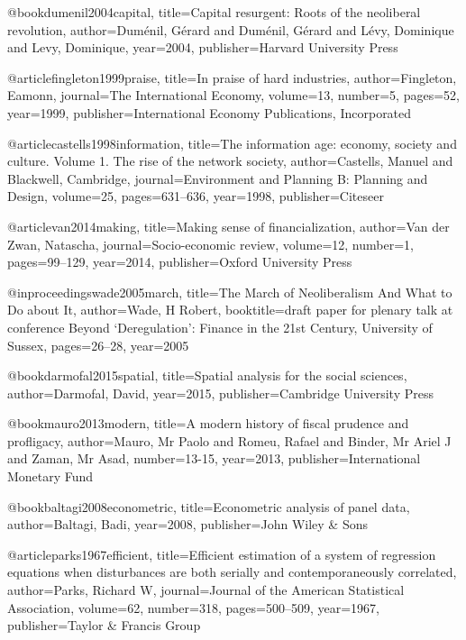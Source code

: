 @book{dumenil2004capital,
  title={Capital resurgent: Roots of the neoliberal revolution},
  author={Dum{\'e}nil, G{\'e}rard and Dum{\'e}nil, G{\'e}rard and L{\'e}vy, Dominique and Levy, Dominique},
  year={2004},
  publisher={Harvard University Press}
}

@article{fingleton1999praise,
  title={In praise of hard industries},
  author={Fingleton, Eamonn},
  journal={The International Economy},
  volume={13},
  number={5},
  pages={52},
  year={1999},
  publisher={International Economy Publications, Incorporated}
}

@article{castells1998information,
  title={The information age: economy, society and culture. Volume 1. The rise of the network society},
  author={Castells, Manuel and Blackwell, Cambridge},
  journal={Environment and Planning B: Planning and Design},
  volume={25},
  pages={631--636},
  year={1998},
  publisher={Citeseer}
}

@article{van2014making,
  title={Making sense of financialization},
  author={Van der Zwan, Natascha},
  journal={Socio-economic review},
  volume={12},
  number={1},
  pages={99--129},
  year={2014},
  publisher={Oxford University Press}
}

@inproceedings{wade2005march,
  title={The March of Neoliberalism And What to Do about It},
  author={Wade, H Robert},
  booktitle={draft paper for plenary talk at conference Beyond ‘Deregulation’: Finance in the 21st Century, University of Sussex},
  pages={26--28},
  year={2005}
}

@book{darmofal2015spatial,
  title={Spatial analysis for the social sciences},
  author={Darmofal, David},
  year={2015},
  publisher={Cambridge University Press}
}

@book{mauro2013modern,
  title={A modern history of fiscal prudence and profligacy},
  author={Mauro, Mr Paolo and Romeu, Rafael and Binder, Mr Ariel J and Zaman, Mr Asad},
  number={13-15},
  year={2013},
  publisher={International Monetary Fund}
}

@book{baltagi2008econometric,
  title={Econometric analysis of panel data},
  author={Baltagi, Badi},
  year={2008},
  publisher={John Wiley \& Sons}
}

@article{parks1967efficient,
  title={Efficient estimation of a system of regression equations when disturbances are both serially and contemporaneously correlated},
  author={Parks, Richard W},
  journal={Journal of the American Statistical Association},
  volume={62},
  number={318},
  pages={500--509},
  year={1967},
  publisher={Taylor \& Francis Group}
}

